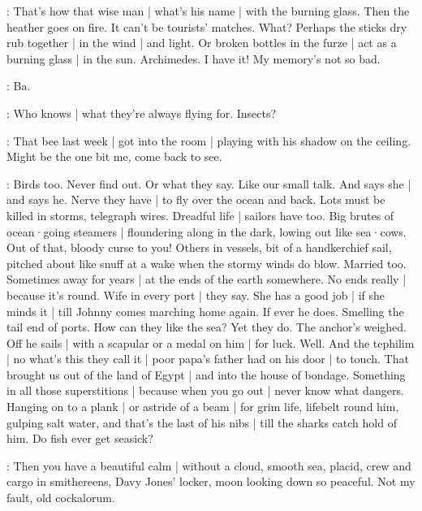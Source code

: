\BloomAbstract:
That's how that wise man |
what's his name |
with the burning glass.
Then the heather goes on fire.
It can't be tourists' matches.
What?%
Perhaps the sticks dry rub together |
in the wind |
and light.
Or broken bottles in the furze |
act as a burning glass |
in the sun.
Archimedes.
I have it!
My memory's not so bad.

\bat:
Ba.

\BloomCurrent:
Who knows |
what they're always flying for.
Insects?

\BloomHist:
That bee last week |
got into the room |
playing with his shadow
on the ceiling.
Might be the one bit me,
come back to see.

\BloomAbstract:
Birds too.
Never find out.
Or what they say.
Like our small talk.
And says she |
and says he.
Nerve they have |
to fly over the ocean
and back.
Lots must be killed in storms,
telegraph wires.
Dreadful life |
sailors have too.
Big brutes of ocean·going steamers |
floundering along in the dark,
lowing out like sea·cows.
Out of that,
bloody curse to you!%
Others in vessels,
bit of a handkerchief sail,
pitched about like snuff at a wake
when the stormy winds do blow.
Married too.
Sometimes away for years |
at the ends of the earth somewhere.
No ends really |
because it's round.
Wife in every port |
they say.
She has a good job |
if she minds it |
till Johnny comes marching home again.
If ever he does.
Smelling the tail end of ports.
How can they like the sea?
Yet they do.
The anchor's weighed.
Off he sails |
with a scapular or a medal on him |
for luck.
Well.
And the tephilim |
no what's this they call it |
poor papa's father had on his door |
to touch.
That brought us out of the land of Egypt |
and into the house of bondage.
Something in all those superstitions |
because when you go out |
never know what dangers.%
Hanging on to a plank |
or astride of a beam |
for grim life,
lifebelt round him,
gulping salt water,
and that's the last of his nibs |
till the sharks catch hold of him.
Do fish ever get seasick?

\BloomAbstract:
Then you have a beautiful calm |
without a cloud,
smooth sea,
placid,
crew and cargo in smithereens,
Davy Jones' locker,
moon looking down so peaceful.
Not my fault,
old cockalorum.

